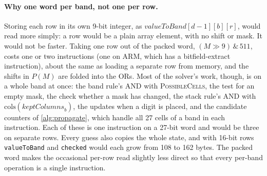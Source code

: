 \paragraph{Why one word per band, not one per row.} Storing each row in its own 9-bit integer, as
$\mathit{valueToBand}[d-1][b][r]$, would read more simply: a row would be a plain array element, with no shift or mask. It
would not be faster. Taking one row out of the packed word, $(M\gg 9)\,\&\,511$, costs one or two instructions (one on
ARM, which has a bitfield-extract instruction), about the same as loading a separate row from memory, and the shifts in
$P(M)$ are folded into the ORs. Most of the solver's work, though, is on a whole band at once: the band rule's AND with
\textsc{PossibleCells}, the test for an empty mask, the check whether a mask has changed, the stack rule's AND with
$\mathrm{cols}(\mathit{keptColumns}_b)$, the updates when a digit is placed, and the candidate counters of \cref{alg:propagate}, which
handle all 27 cells of a band in each instruction. Each of these is one instruction on a 27-bit word and would be three
on separate rows. Every guess also copies the whole state, and with 16-bit rows \texttt{valueToBand} and \texttt{checked}
would each grow from 108 to 162 bytes. The packed word makes the occasional per-row read slightly less direct so that
every per-band operation is a single instruction.

